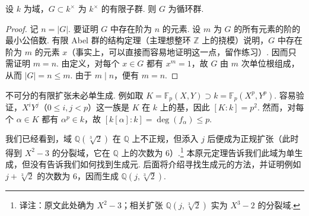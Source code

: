 \begin{lemma*}
设 $k$ 为域，$G\subset k^\times$ 为 $k^\times$ 的有限子群. 则 $G$ 为循环群.
\end{lemma*}
\begin{proof}
记 $n=|G|$. 要证明 $G$ 中存在阶为 $n$ 的元素. 设 $m$ 为 $G$ 的所有元素的阶的最小公倍数. 有限 Abel 群的结构定理（主理想整环 $\mathbb Z$ 上的挠模）说明，$G$ 中存在阶为 $m$ 的元素 $x$（事实上，可以直接而容易地证明这一点，留作练习）. 因而只需证明 $m=n$. 由定义，对每个 $x\in G$ 都有 $x^m=1$，故 $G$ 由 $m$ 次单位根组成，从而 $|G|=n\leqslant m$. 由于 $m\mid n$，便有 $m=n$.
\end{proof}
\begin{remark*}
不可分的有限扩张未必单生成. 例如取 $K=\mathbb F_p(X,Y)\supset k=\mathbb F_p(X^p,Y^p)$. 容易验证，$X^iY^j$（$0\leqslant i,j<p$）这一族是 $K$ 在 $k$ 上的基，因此 $[K:k]=p^2$. 然而，对每个 $\alpha\in K$ 都有 $\alpha^p\in k$，故 $[k[\alpha]:k]=\deg(f_\alpha)\leqslant p$.
\end{remark*}
\begin{example*}
我们已经看到，域 $\mathbb Q(\sqrt[3]2)$ 在 $\mathbb Q$ 上不正规，但添入 $j$ 后便成为正规扩张（此时得到 $X^2-3$ 的分裂域，它在 $\mathbb Q$ 上的次数为 $6$）.\footnote{译注：原文此处确为 $X^2-3$；相关扩张 $\mathbb Q(j,\sqrt[3]2)$ 实为 $X^3-2$ 的分裂域.} 本原元定理告诉我们此域为单生成，但没有告诉我们如何找到生成元. 后面将介绍寻找生成元的方法，并证明例如 $j+\sqrt[3]2$ 的次数为 $6$，因而生成 $\mathbb Q(j,\sqrt[3]2)$.
\end{example*}



